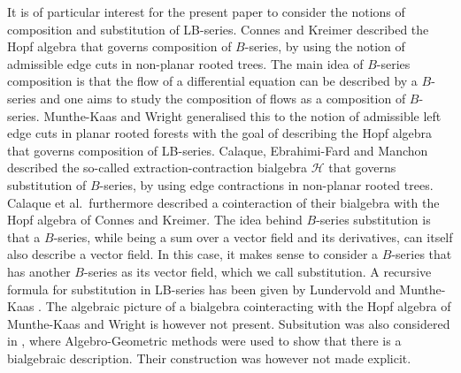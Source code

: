 \documentclass[10pt,a4paper]{article}
\begin{document}
It is of particular interest for the present paper to consider the notions of composition and substitution of LB-series. Connes and Kreimer \cite{ConnesKreimer1998} described the Hopf algebra that governs composition of $B$-series, by using the notion of admissible edge cuts in non-planar rooted trees. The main idea of $B$-series composition is that the flow of a differential equation can be described by a $B$-series and one aims to study the composition of flows as a composition of $B$-series. Munthe-Kaas and Wright \cite{Munthe-KaasWright2008} generalised this to the notion of admissible left edge cuts in planar rooted forests with the goal of describing the Hopf algebra that governs composition of LB-series. Calaque, Ebrahimi-Fard and Manchon \cite{CalaqueEbrahimi-FardManchon2011} described the so-called extraction-contraction bialgebra $\mathcal{H}$ that governs substitution of $B$-series, by using edge contractions in non-planar rooted trees. Calaque et al.~furthermore described a cointeraction of their bialgebra with the Hopf algebra of Connes and Kreimer. The idea behind $B$-series substitution is that a $B$-series, while being a sum over a vector field and its derivatives, can itself also describe a vector field. In this case, it makes sense to consider a $B$-series that has another $B$-series as its vector field, which we call substitution. A recursive formula for substitution in LB-series has been given by Lundervold and Munthe-Kaas \cite{LundervoldMunthe-Kaas2011}. The algebraic picture of a bialgebra cointeracting with the Hopf algebra of Munthe-Kaas and Wright is however not present. Subsitution was also considered in \cite{FloystadMunthe-Kaas}, where Algebro-Geometric methods were used to show that there is a bialgebraic description. Their construction was however not made explicit.
\end{document}
